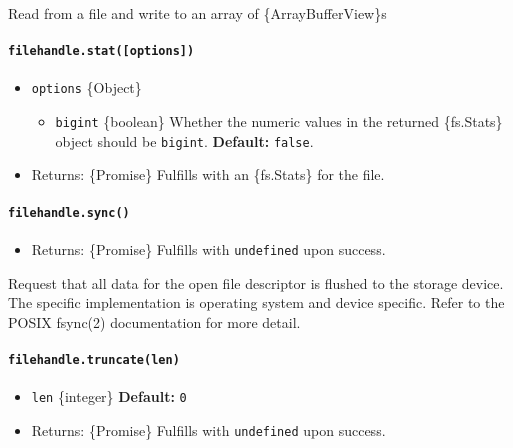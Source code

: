 Read from a file and write to an array of \{ArrayBufferView\}s

\paragraph{\texorpdfstring{\texttt{filehandle.stat({[}options{]})}}{filehandle.stat({[}options{]})}}\label{filehandle.statoptions}

\begin{itemize}
\tightlist
\item
  \texttt{options} \{Object\}

  \begin{itemize}
  \tightlist
  \item
    \texttt{bigint} \{boolean\} Whether the numeric values in the
    returned \{fs.Stats\} object should be \texttt{bigint}.
    \textbf{Default:} \texttt{false}.
  \end{itemize}
\item
  Returns: \{Promise\} Fulfills with an \{fs.Stats\} for the file.
\end{itemize}

\paragraph{\texorpdfstring{\texttt{filehandle.sync()}}{filehandle.sync()}}\label{filehandle.sync}

\begin{itemize}
\tightlist
\item
  Returns: \{Promise\} Fulfills with \texttt{undefined} upon success.
\end{itemize}

Request that all data for the open file descriptor is flushed to the
storage device. The specific implementation is operating system and
device specific. Refer to the POSIX fsync(2) documentation for more
detail.

\paragraph{\texorpdfstring{\texttt{filehandle.truncate(len)}}{filehandle.truncate(len)}}\label{filehandle.truncatelen}

\begin{itemize}
\tightlist
\item
  \texttt{len} \{integer\} \textbf{Default:} \texttt{0}
\item
  Returns: \{Promise\} Fulfills with \texttt{undefined} upon success.
\end{itemize}

